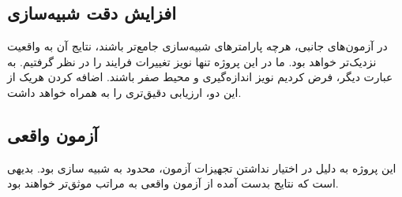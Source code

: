 \subsection{افزایش دقت شبیه‌سازی}
در آزمون‌های جانبی، هرچه پارامترهای شبیه‌سازی جامع‌تر باشند، نتایج آن به واقعیت نزدیک‌تر خواهد بود. ما در این پروژه تنها نویز تغییرات فرایند را در نظر گرفتیم. به عبارت دیگر، فرض کردیم نویز اندازه‌گیری و محیط صفر باشند. اضافه کردن هریک از این دو، ارزیابی دقیق‌تری را به همراه خواهد داشت.
\subsection{آزمون واقعی}
این پروژه به دلیل در اختیار نداشتن تجهیزات آزمون، محدود به شبیه سازی بود. بدیهی است که نتایج بدست آمده از آزمون واقعی به مراتب موثق‌تر خواهند بود. 
